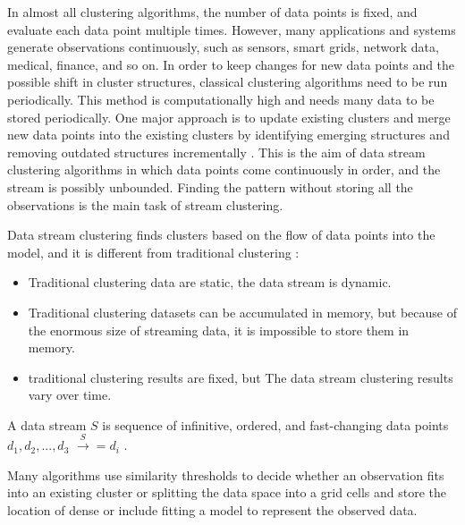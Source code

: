 \documentclass[../UNBThesis2.tex]{subfiles}
\begin{document}


In almost all clustering algorithms, the number of data points is fixed, and evaluate each data point multiple times. However, many applications and systems generate observations continuously, such as sensors, smart grids, network data, medical, finance, and so on. In order to keep changes for new data points and the possible shift in cluster structures, classical clustering algorithms need to be run periodically. This method is computationally high and needs many data to be stored periodically. One major approach is to update existing clusters and merge new data points into the existing clusters by identifying emerging structures and removing outdated structures incrementally \cite{carnein2019optimizing}. This is the aim of data stream clustering algorithms in which data points come continuously in order, and the stream is possibly unbounded. Finding the pattern without storing all the observations is the main task of stream clustering.

Data stream clustering finds clusters based on the flow of data points into the model, and it is different from traditional clustering \cite{toshniwal2013clustering}:
\begin{itemize}
    \item Traditional clustering data are static, the data stream is dynamic.
    \item Traditional clustering datasets can be accumulated in memory, but because of the enormous size of streaming data, it is impossible to store them in memory.
    \item traditional clustering results are fixed, but The data stream clustering results vary over time.
\end{itemize}

A data stream $S$ is sequence of infinitive, ordered, and fast-changing data points $d_1, d_2, ..., d_3 $ $\xrightarrow S = {d_i}$ \cite{han2011data}.


Many algorithms use similarity thresholds to decide whether an observation fits into an existing cluster or splitting the data space into a grid cells and store the location of dense or include fitting a model to represent the observed data.
\end{document}
